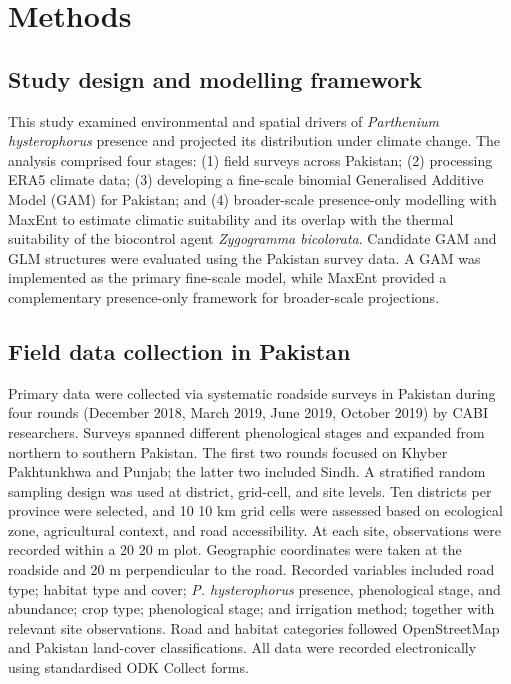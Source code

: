 \chapter{Methods}

\section{Study design and modelling framework}

This study examined environmental and spatial drivers of \textit{Parthenium hysterophorus} presence and projected its distribution under climate change. The analysis comprised four stages: (1) field surveys across Pakistan; (2) processing ERA5 climate data; (3) developing a fine-scale binomial Generalised Additive Model (GAM) for Pakistan; and (4) broader-scale presence-only modelling with MaxEnt to estimate climatic suitability and its overlap with the thermal suitability of the biocontrol agent \textit{Zygogramma bicolorata}. Candidate GAM and GLM structures were evaluated using the Pakistan survey data. A GAM was implemented as the primary fine-scale model, while MaxEnt provided a complementary presence-only framework for broader-scale projections.

\section{Field data collection in Pakistan}

Primary data were collected via systematic roadside surveys in Pakistan during four rounds (December 2018, March 2019, June 2019, October 2019) by CABI researchers. Surveys spanned different phenological stages and expanded from northern to southern Pakistan. The first two rounds focused on Khyber Pakhtunkhwa and Punjab; the latter two included Sindh. A stratified random sampling design was used at district, grid-cell, and site levels. Ten districts per province were selected, and 10 \texttimes{} 10 km grid cells were assessed based on ecological zone, agricultural context, and road accessibility. At each site, observations were recorded within a 20 \texttimes{} 20 m plot. Geographic coordinates were taken at the roadside and 20 m perpendicular to the road. Recorded variables included road type; habitat type and cover; \textit{P. hysterophorus} presence, phenological stage, and abundance; crop type; phenological stage; and irrigation method; together with relevant site observations. Road and habitat categories followed OpenStreetMap and Pakistan land-cover classifications. All data were recorded electronically using standardised ODK Collect forms.

